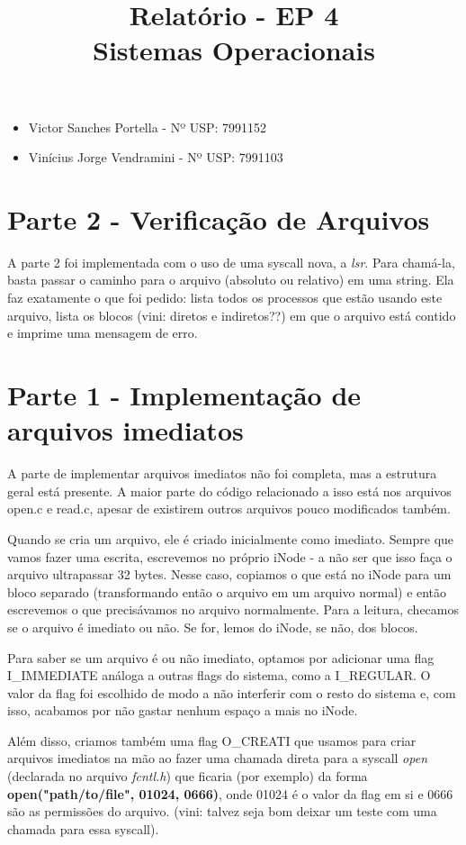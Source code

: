 \documentclass[11pt]{article}
\title{Relatório - EP 4 \\ Sistemas Operacionais}
\begin{document}
    \maketitle

    \begin{itemize}
        \item Victor Sanches Portella - Nº USP: 7991152
        \item Vinícius Jorge Vendramini - Nº USP: 7991103
    \end{itemize}


    \section*{Parte 2 - Verificação de Arquivos}
    A parte 2 foi implementada com o uso de uma syscall nova, a \textit{lsr}. Para chamá-la, basta passar o caminho para o arquivo (absoluto ou relativo) em uma string. Ela faz exatamente o que foi pedido: lista todos os processos que estão usando este arquivo, lista os blocos (vini: diretos e indiretos??) em que o arquivo está contido e imprime uma mensagem de erro.

    \section*{Parte 1 - Implementação de arquivos imediatos}
    A parte de implementar arquivos imediatos não foi completa, mas a estrutura geral está presente. A maior parte do código relacionado a isso está nos arquivos open.c e read.c, apesar de existirem outros arquivos pouco modificados também.

    Quando se cria um arquivo, ele é criado inicialmente como imediato. Sempre que vamos fazer uma escrita, escrevemos no próprio iNode - a não ser que isso faça o arquivo ultrapassar 32 bytes. Nesse caso, copiamos o que está no iNode para um bloco separado (transformando então o arquivo em um arquivo normal) e então escrevemos o que precisávamos no arquivo normalmente. Para a leitura, checamos se o arquivo é imediato ou não. Se for, lemos do iNode, se não, dos blocos.

    Para saber se um arquivo é ou não imediato, optamos por adicionar uma flag I\_IMMEDIATE análoga a outras flags do sistema, como a I\_REGULAR. O valor da flag foi escolhido de modo a não interferir com o resto do sistema e, com isso, acabamos por não gastar nenhum espaço a mais no iNode.

    Além disso, criamos também uma flag O\_CREATI que usamos para criar arquivos imediatos na mão ao fazer uma chamada direta para a syscall \textit{open} (declarada no arquivo \textit{fcntl.h}) que ficaria (por exemplo) da forma \textbf{open("path/to/file", 01024, 0666)}, onde 01024 é o valor da flag em si e 0666 são as permissões do arquivo. (vini: talvez seja bom deixar um teste com uma chamada para essa syscall).
\end{document}

